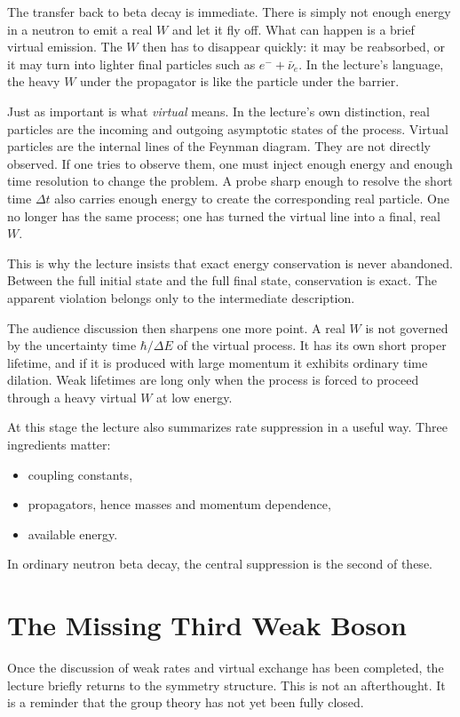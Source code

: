 The transfer back to beta decay is immediate. There is simply not enough energy in a neutron to emit a real \(W\) and let it fly off. What can happen is a brief virtual emission. The \(W\) then has to disappear quickly: it may be reabsorbed, or it may turn into lighter final particles such as \(e^-+\bar{\nu}_e\). In the lecture's language, the heavy \(W\) under the propagator is like the particle under the barrier.

Just as important is what \emph{virtual} means. In the lecture's own distinction, real particles are the incoming and outgoing asymptotic states of the process. Virtual particles are the internal lines of the Feynman diagram. They are not directly observed. If one tries to observe them, one must inject enough energy and enough time resolution to change the problem. A probe sharp enough to resolve the short time \(\Delta t\) also carries enough energy to create the corresponding real particle. One no longer has the same process; one has turned the virtual line into a final, real \(W\).

This is why the lecture insists that exact energy conservation is never abandoned. Between the full initial state and the full final state, conservation is exact. The apparent violation belongs only to the intermediate description.

The audience discussion then sharpens one more point. A real \(W\) is not governed by the uncertainty time \(\hbar/\Delta E\) of the virtual process. It has its own short proper lifetime, and if it is produced with large momentum it exhibits ordinary time dilation. Weak lifetimes are long only when the process is forced to proceed through a heavy virtual \(W\) at low energy.

At this stage the lecture also summarizes rate suppression in a useful way. Three ingredients matter:
\begin{itemize}
\item coupling constants,
\item propagators, hence masses and momentum dependence,
\item available energy.
\end{itemize}
In ordinary neutron beta decay, the central suppression is the second of these.

\section{The Missing Third Weak Boson}

Once the discussion of weak rates and virtual exchange has been completed, the lecture briefly returns to the symmetry structure. This is not an afterthought. It is a reminder that the group theory has not yet been fully closed.

